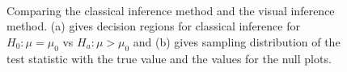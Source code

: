 \documentclass[12]{article}
\begin{document}
%

\begin{figure}[htbp]
\centering
\mbox{\quad
{}}
\caption{Comparing the classical inference method and the visual inference method.  (a) gives decision regions  for classical inference for $H_0: \mu=\mu_0$ vs $H_a:\mu>\mu_0$ and (b) gives sampling distribution of the test statistic with the true value and the values for the null plots.  } 
\label{compare}
\end{figure}
\end{document}
